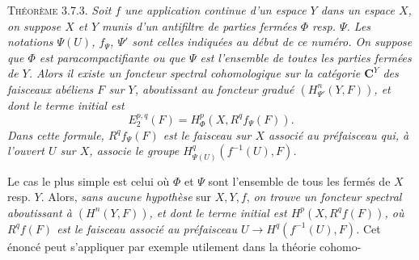 \textsc{Théorème 3.7.3.} \textit{Soit $f$ une application
continue d'un espace $Y$ dans un espace $X$, on suppose $X$ et $Y$ munis d'un
antifiltre de parties fermées $\Phi$ resp. $\Psi$. Les notations $\Psi(U)$,
$f_\Psi$, $\Psi'$ sont celles indiquées au début de ce numéro. On suppose que
$\Phi$ est paracompactifiante ou que $\Psi$ est l'ensemble de toutes les
parties fermées de $Y$. Alors il existe un foncteur spectral cohomologique sur
la catégorie $\mathbf C^Y$ des faisceaux abéliens $F$ sur $Y$, aboutissant au foncteur
gradué $(H^n_{\Psi'}(Y,F))$, et dont le terme initial est}
\[
E_2^{p,q}(F)=H^p_\Phi(X,R^qf_\Psi(F)).
\]
\textit{Dans cette formule, $R^qf_\Psi(F)$ est le faisceau sur $X$ associé au
préfaisceau qui, à l'ouvert $U$ sur $X$, associe le groupe
$H^q_{\Psi(U)}(f^{-1}(U),F)$.}

Le cas le plus simple est celui où $\Phi$ et $\Psi$ sont l'ensemble de tous les
fermés de $X$ resp. $Y$. Alors, \textit{sans aucune hypothèse} sur $X,Y,f$, \textit{on
trouve un foncteur spectral aboutissant à $(H^n(Y,F))$, et dont le terme
initial est
$H^p(X,R^qf(F))$, où $R^qf(F)$ est le faisceau associé au préfaisceau
$U\to H^q(f^{-1}(U),F)$.}
Cet énoncé peut s'appliquer par exemple utilement dans la théorie cohomo-

